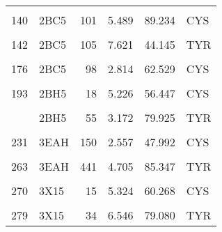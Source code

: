 \begin{table}
\begin{tabular}{llrrrl}
			\cellcolor{gray!6}{133} & \cellcolor{gray!6}{1W2L} & \cellcolor{gray!6}{80} & \cellcolor{gray!6}{1.717} & \cellcolor{gray!6}{80.939} & \cellcolor{gray!6}{TYR}\\
			140 & 2BC5 & 101 & 5.489 & 89.234 & CYS\\
			\cellcolor{gray!6}{141} & \cellcolor{gray!6}{2BC5} & \cellcolor{gray!6}{102} & \cellcolor{gray!6}{2.941} & \cellcolor{gray!6}{82.850} & \cellcolor{gray!6}{HIS}\\
			142 & 2BC5 & 105 & 7.621 & 44.145 & TYR\\
			\addlinespace
			\cellcolor{gray!6}{162} & \cellcolor{gray!6}{2BC5} & \cellcolor{gray!6}{63} & \cellcolor{gray!6}{10.176} & \cellcolor{gray!6}{35.590} & \cellcolor{gray!6}{HIS}\\
			176 & 2BC5 & 98 & 2.814 & 62.529 & CYS\\
			\cellcolor{gray!6}{190} & \cellcolor{gray!6}{2BH5} & \cellcolor{gray!6}{15} & \cellcolor{gray!6}{3.173} & \cellcolor{gray!6}{80.908} & \cellcolor{gray!6}{CYS}\\
			193 & 2BH5 & 18 & 5.226 & 56.447 & CYS\\
			\cellcolor{gray!6}{194} & \cellcolor{gray!6}{2BH5} & \cellcolor{gray!6}{19} & \cellcolor{gray!6}{2.432} & \cellcolor{gray!6}{56.825} & \cellcolor{gray!6}{HIS}\\
			\addlinespace
			209 & 2BH5 & 55 & 3.172 & 79.925 & TYR\\
			\cellcolor{gray!6}{217} & \cellcolor{gray!6}{2BH5} & \cellcolor{gray!6}{79} & \cellcolor{gray!6}{3.392} & \cellcolor{gray!6}{66.731} & \cellcolor{gray!6}{TYR}\\
			231 & 3EAH & 150 & 2.557 & 47.992 & CYS\\
			\cellcolor{gray!6}{250} & \cellcolor{gray!6}{3EAH} & \cellcolor{gray!6}{323} & \cellcolor{gray!6}{8.876} & \cellcolor{gray!6}{55.586} & \cellcolor{gray!6}{TYR}\\
			263 & 3EAH & 441 & 4.705 & 85.347 & TYR\\
			\addlinespace
			\cellcolor{gray!6}{267} & \cellcolor{gray!6}{3X15} & \cellcolor{gray!6}{12} & \cellcolor{gray!6}{2.836} & \cellcolor{gray!6}{75.877} & \cellcolor{gray!6}{CYS}\\
			270 & 3X15 & 15 & 5.324 & 60.268 & CYS\\
			\cellcolor{gray!6}{271} & \cellcolor{gray!6}{3X15} & \cellcolor{gray!6}{16} & \cellcolor{gray!6}{2.626} & \cellcolor{gray!6}{56.339} & \cellcolor{gray!6}{HIS}\\
			279 & 3X15 & 34 & 6.546 & 79.080 & TYR\\

\end{tabular}
\end{table}
